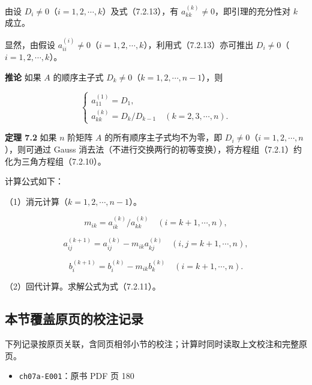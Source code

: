 \documentclass[
  10pt,
  fontset=fandol]{ctexart}
\providecommand{\tightlist}{%
  \setlength{\itemsep}{0pt}\setlength{\parskip}{0pt}}
\begin{document}
由设 \(D_i\ne0\)（\(i=1,2,\cdots,k\)）及式（7.2.13），有 \(a_{kk}^{(k)}\ne0\)，即引理的充分性对 \(k\) 成立。

显然，由假设 \(a_{ii}^{(i)}\ne0\)（\(i=1,2,\cdots,k\)），利用式（7.2.13）亦可推出 \(D_i\ne0\)（\(i=1,2,\cdots,k\)）。

\textbf{推论} 如果 \(A\) 的顺序主子式 \(D_k\ne0\)（\(k=1,2,\cdots,n-1\)），则

\[
\begin{cases}
a_{11}^{(1)}=D_1,\\
a_{kk}^{(k)}=D_k/D_{k-1}\quad(k=2,3,\cdots,n).
\end{cases}
\]

\textbf{定理 7.2} 如果 \(n\) 阶矩阵 \(A\) 的所有顺序主子式均不为零，即 \(D_i\ne0\)（\(i=1,2,\cdots,n\)），则可通过 Gauss 消去法（不进行交换两行的初等变换），将方程组（7.2.1）约化为三角方程组（7.2.10）。

计算公式如下：

（1）消元计算（\(k=1,2,\cdots,n-1\)）。

\[m_{ik}=a_{ik}^{(k)}/a_{kk}^{(k)}\quad(i=k+1,\cdots,n),\]

\[a_{ij}^{(k+1)}=a_{ij}^{(k)}-m_{ik}a_{kj}^{(k)}\quad(i,j=k+1,\cdots,n),\]

\[b_i^{(k+1)}=b_i^{(k)}-m_{ik}b_k^{(k)}\quad(i=k+1,\cdots,n).\]

（2）回代计算。求解公式为式（7.2.11）。

\subsection{本节覆盖原页的校注记录}\label{ux672cux8282ux8986ux76d6ux539fux9875ux7684ux6821ux6ce8ux8bb0ux5f55}

下列记录按原页关联，含同页相邻小节的校注；计算时同时读取上文校注和完整原页。

\begin{itemize}
\tightlist
\item
  \texttt{ch07a-E001}：原书 PDF 页 180
\end{itemize}
\end{document}
